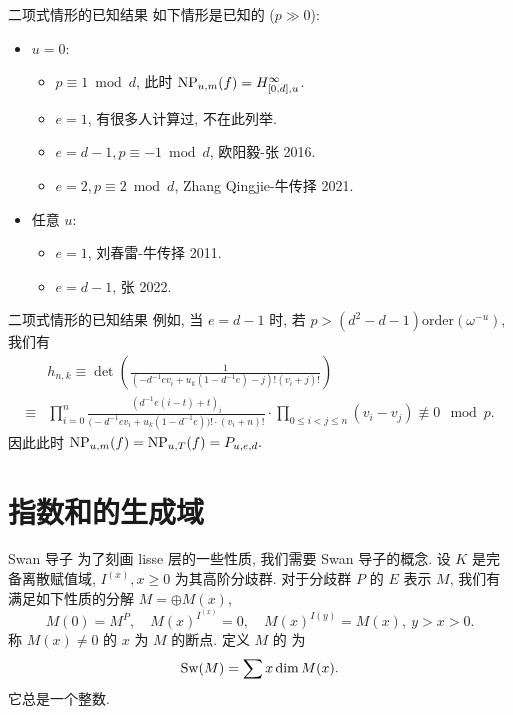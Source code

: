\documentclass[aspectratio=169,handout]{ctexbeamer}
\renewcommand\emph[1]{{\color{structure.fg!50!blue}{#1}}}
\begin{document}
\begin{frame}{二项式情形的已知结果}
如下情形是已知的 ($p\gg0$):
\begin{itemize}
\item $u=0$:
\begin{itemize}
\item $p\equiv 1\bmod d$, 此时 ${\mathrm{NP}}_{u,m}(f)=H_{[0,d],u}^\infty$.
\item $e=1$, 有很多人计算过, 不在此列举.
\item $e=d-1,p\equiv -1\bmod d$, 欧阳毅-张 2016.
\item $e=2,p\equiv 2\bmod d$, Zhang Qingjie-牛传择 2021.
\end{itemize}
\item 任意 $u$:
\begin{itemize}
	\item $e=1$, 刘春雷-牛传择 2011.
	\item $e=d-1$, 张 2022.
\end{itemize}
\end{itemize}
\end{frame}


\begin{frame}{二项式情形的已知结果}
例如, 当 $e=d-1$ 时, 若 $p>(d^2-d-1)\mathrm{order}(\omega^{-u})$, 我们有
	\[\begin{split}
	&h_{n,k}\equiv\det\left(\frac{1}{(-d^{-1}ev_i+u_k(1-d^{-1}e)-j)!(v_i+j)!}\right)\\
\equiv &\prod_{i=0}^n \frac{\left(d^{-1}e(i-t)+t\right)_i}{\bigl(-d^{-1}ev_i+u_k(1-d^{-1}e)\bigr)!\cdot(v_i+n)!} \cdot \prod_{0\le i<j\le n}(v_i-v_j)\not\equiv 0\mod p.
\end{split}\]
因此此时 ${\mathrm{NP}}_{u,m}(f)={\mathrm{NP}}_{u,T}(f)=P_{u,e,d}.$
\end{frame}



\section{指数和的生成域}



\begin{frame}{Swan 导子}
为了刻画 lisse 层的一些性质, 我们需要 Swan 导子的概念.
设 $K$ 是完备离散赋值域, $I^{(x)},x\ge 0$ 为其高阶分歧群. 
对于分歧群 $P$ 的 $E$ 表示 $M$, 我们有满足如下性质的分解 $M=\oplus M(x)$, 
	\[M(0)=M^P,\quad M(x)^{I^{(x)}}=0,\quad M(x)^{I(y)}=M(x), \ y>x>0.\]
称 $M(x)\neq 0$ 的 $x$ 为 $M$ 的断点.
定义 $M$ 的 \emph{Swan 导子}为
	\[{\mathrm{Sw}}(M)=\sum x\dim M(x).\]
它总是一个整数.
\end{frame}
\end{document}
